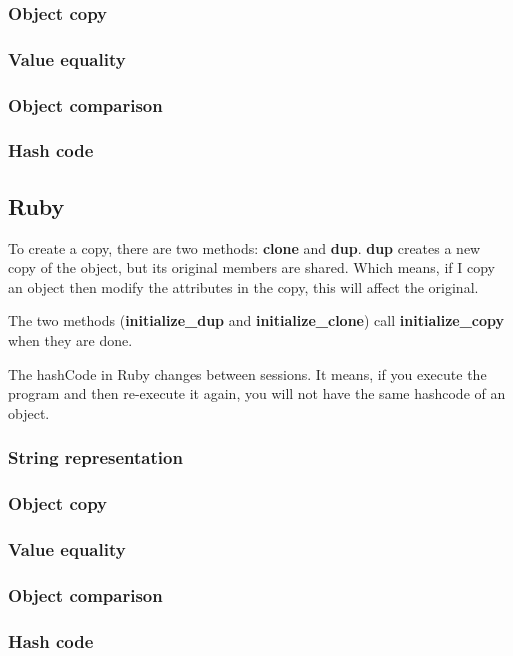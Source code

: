 \documentclass{KodeBook}
\begin{document}
\subsubsection{Object copy}

\subsubsection{Value equality}

\subsubsection{Object comparison}

\subsubsection{Hash code}

\subsection{Ruby}

To create a copy, there are two methods: \textbf{clone} and \textbf{dup}. 
\textbf{dup} creates a new copy of the object, but its original members are shared. 
Which means, if I copy an object then modify the attributes in the copy, this will affect the original.



The two methods (\textbf{initialize\_dup} and \textbf{initialize\_clone}) call \textbf{initialize\_copy} when they are done.


The hashCode in Ruby changes between sessions.
It means, if you execute the program and then re-execute it again, you will not have the same hashcode of an object.

\subsubsection{String representation}

\subsubsection{Object copy}

\subsubsection{Value equality}

\subsubsection{Object comparison}

\subsubsection{Hash code}

\ifx\wholebook\relax\else
% 
% 
	
\end{document}
